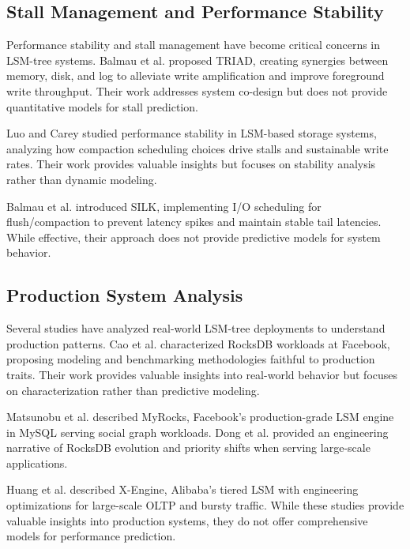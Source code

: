 \documentclass[11pt]{article}
\begin{document}
\subsection{Stall Management and Performance Stability}

Performance stability and stall management have become critical concerns in LSM-tree systems. Balmau et al. \cite{balmau2017triad} proposed TRIAD, creating synergies between memory, disk, and log to alleviate write amplification and improve foreground write throughput. Their work addresses system co-design but does not provide quantitative models for stall prediction.

Luo and Carey \cite{luo2019stability} studied performance stability in LSM-based storage systems, analyzing how compaction scheduling choices drive stalls and sustainable write rates. Their work provides valuable insights but focuses on stability analysis rather than dynamic modeling.

Balmau et al. \cite{balmau2019silk} introduced SILK, implementing I/O scheduling for flush/compaction to prevent latency spikes and maintain stable tail latencies. While effective, their approach does not provide predictive models for system behavior.

\subsection{Production System Analysis}

Several studies have analyzed real-world LSM-tree deployments to understand production patterns. Cao et al. \cite{cao2020rocksdbmodel} characterized RocksDB workloads at Facebook, proposing modeling and benchmarking methodologies faithful to production traits. Their work provides valuable insights into real-world behavior but focuses on characterization rather than predictive modeling.

Matsunobu et al. \cite{matsunobu2020myrocks} described MyRocks, Facebook's production-grade LSM engine in MySQL serving social graph workloads. Dong et al. \cite{dong2021rocksdbcacm} provided an engineering narrative of RocksDB evolution and priority shifts when serving large-scale applications.

Huang et al. \cite{huang2019xengine} described X-Engine, Alibaba's tiered LSM with engineering optimizations for large-scale OLTP and bursty traffic. While these studies provide valuable insights into production systems, they do not offer comprehensive models for performance prediction.
\end{document}
